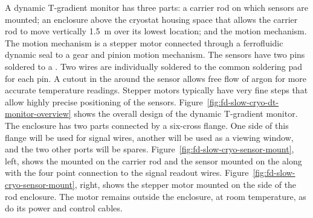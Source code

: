 A dynamic T-gradient monitor has three parts: a carrier rod on which sensors are mounted; an enclosure above the cryostat housing space that allows the carrier rod to move vertically  \SI{1.5}{m} over its lowest location; and the motion mechanism. The motion mechanism is a stepper motor connected through a ferrofluidic dynamic seal to a gear and pinion motion mechanism. The sensors have two pins soldered to a . 
Two wires are individually soldered to the common soldering pad for each pin.  A cutout in the  around the sensor allows free flow of argon for more accurate temperature readings.  Stepper motors typically have very fine steps that allow highly precise positioning of the sensors.  Figure~\ref{fig:fd-slow-cryo-dt-monitor-overview} shows the overall design of the dynamic T-gradient monitor. %
The enclosure has two parts connected by a six-cross flange. One side of this flange will be used for signal wires, another will be used as a viewing window, and the two other ports will be spares. Figure~\ref{fig:fd-slow-cryo-sensor-mount}, left, shows the  mounted on the carrier rod and the sensor mounted on the  along with the four point connection to the signal readout wires. %
Figure~\ref{fig:fd-slow-cryo-sensor-mount}, right, shows the stepper motor mounted on the side of the rod enclosure. The motor remains outside the enclosure, at room temperature, %
as do its power and control cables. %

